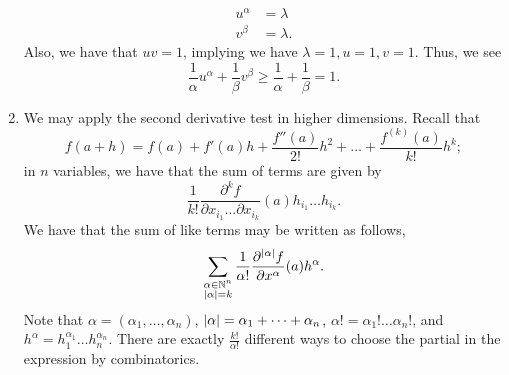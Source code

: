 \begin{enumerate}[label=(\alph*)]
\begin{align*}
        u^\alpha &= \lambda \\
        v^\beta &= \lambda.
    \end{align*}
    Also, we have that $uv = 1$, implying we have $\lambda = 1, u = 1, v = 1$. Thus, we see
    \[ \frac{1}{\alpha} u^\alpha + \frac{1}{\beta} v^\beta \geq \frac{1}{\alpha} + \frac{1}{\beta} = 1. \]
    \item We may apply the second derivative test in higher dimensions. Recall that
    \[ f(a + h) = f(a) + f'(a)h + \frac{f''(a)}{2!} h^2 + \dots + \frac{f^{(k)}(a)}{k!} h^k; \]
    in $n$ variables, we have that the sum of terms are given by
    \[ \frac{1}{k!} \frac{\partial^k f}{\partial x_{i_1} \dots \partial x_{i_k}} (a) h_{i_1} \dots h_{i_k}. \]
    We have that the sum of like terms may be written as follows,
    \[ \sum_{\substack{\alpha \in \mathbb N^n \\ \left\lvert \alpha \right\rvert = k}} \frac{1}{\alpha!} \frac{\partial^{\left\lvert \alpha \right\rvert} f}{\partial x^\alpha} (a) h^\alpha. \]
    Note that $\alpha = (\alpha_1, \dots, \alpha_n)$, $\left\lvert \alpha \right\rvert = \alpha_1 + \dots + \alpha_n$, $\alpha! = \alpha_1! \dots \alpha_n!$, and $h^\alpha = h_1^{\alpha_1} \dots h_n^{\alpha_n}$. There are exactly $\frac{k!}{\alpha!}$ different ways to choose the partial in the expression by combinatorics.
\end{enumerate}
